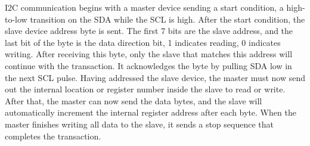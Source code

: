 I2C communication begins with a master device sending a start condition, a high-to-low transition on the SDA while the SCL is high. After the start condition, the slave device address byte is sent. The first 7 bits are the slave address, and the last bit of the byte is the data direction bit, 1 indicates reading, 0 indicates writing.  After receiving this byte, only the slave that matches this address will continue with the transaction. It acknowledges the byte by pulling SDA low in the next SCL pulse. Having addressed the slave device, the master must now send out the internal location or register number inside the slave to read or write.  After that, the master can now send the data bytes, and the slave will automatically increment the internal register address after each byte. When the master finishes writing all data to the slave, it sends a stop sequence that completes the transaction.
